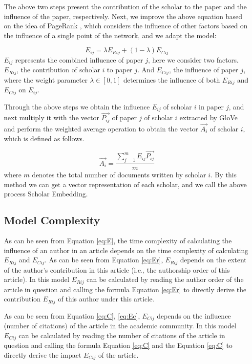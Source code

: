 \documentclass[conference]{IEEEtran}
\begin{document}
The above two steps present the contribution of the scholar to the paper and the influence of the paper, respectively. Next, we improve the above equation based on the idea of PageRank \cite{ilprints422}, which considers the influence of other factors based on the influence of a single point of the network, and we adapt the model:

\begin{equation}\label{eq:E}
   E_{ij} = \lambda E_{Rij} + (1-\lambda)E_{Cij}
\end{equation}
\(E_{ij}\) represents the combined influence of paper \(j\), here
we consider two factors. \(E_{Rij}\), the contribution of scholar \(i\) to paper
\(j\). And \(E_{Cij}\), the influence of paper \(j\),
where the weight parameter \(\lambda \in [0, 1]\) determines the influence of both
\(E_{Rij}\) and \(E_{Cij}\) on \(E_{ij}\).

Through the above steps we obtain the influence \(E_{ij}\) of scholar
\(i\) in paper \(j\), and next multiply it with the vector
\(\vec{P_{ij}}\) of paper \(j\) of scholar \(i\) extracted by GloVe
and perform the weighted average operation to obtain the vector
\(\vec{A_i}\) of scholar \(i\), which is defined as follows.

\begin{equation}\label{eq:A}
    \vec{A_i} = \frac{\sum_{j=1}^{m} E_{ij} \vec{P_{ij}}}{m}
\end{equation}
where \(m\) denotes the total number of documents written by scholar
\(i\). By this method we can get a vector representation of each
scholar, and we call the above process Scholar Embedding.

\subsection{Model Complexity}
As can be seen from Equation \ref{eq:E}, the time complexity of calculating the influence of an author in an article depends on the time complexity of calculating 
\(E_{Rij}\) and \(E_{Cij}\). As can be seen from
Equation \ref{eq:Er}, \(E_{Rij}\) depends on the extent of the author's
contribution in this article (i.e., the authorship order of this
article). In this model \(E_{Rij}\) can be calculated by reading the
author order of the article in question and calling the formula
Equation \ref{eq:Er} to directly derive the contribution \(E_{Rij}\) of
this author under this article.

As can be seen from Equation \ref{eq:C}, \ref{eq:Ec},
\(E_{Cij}\) depends on the influence (number of citations) of the
article in the academic community. In this model \(E_{Cij}\) can be
calculated by reading the number of citations of the article in question
and calling the formula Equation \ref{eq:C} and the
Equation \ref{eq:C} to directly derive the impact \(E_{Cij}\) of the
article.
\end{document}
